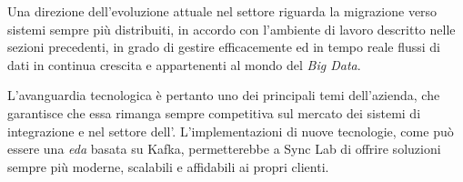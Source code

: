 Una direzione dell'evoluzione attuale nel settore  riguarda la migrazione verso sistemi sempre più distribuiti, in accordo con l'ambiente di lavoro descritto nelle sezioni precedenti, in grado di gestire efficacemente ed in tempo reale flussi di dati in continua crescita e appartenenti al mondo del \textit{Big Data}.

L'avanguardia tecnologica è pertanto uno dei principali temi dell'azienda, che garantisce che essa rimanga sempre competitiva sul mercato dei sistemi di integrazione e nel settore dell'.
L'implementazioni di nuove tecnologie, come può essere una \textit{\acrlong{eda}} basata su Kafka, permetterebbe a Sync Lab di offrire soluzioni sempre più moderne, scalabili e affidabili ai propri clienti.
